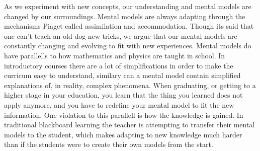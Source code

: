 \bigskip\noindent
As we experiment with new concepts, our understanding and mental models are changed by our surroundings. Mental models are always adapting through the mechanisms Piaget called assimilation and accommodation.
Though its said that one can't teach an old dog new tricks, we argue that our mental models are constantly changing and evolving to fit with new experiences. 
Mental models do have parallells to how mathematics and physics are taught in school. In introductory courses there are a lot of simplifications in order to make the curricum easy to understand, similary can a mental model contain simplified explanations of, in reality, complex phenomena. When graduating, or getting to a higher stage in your education, you learn that the thing you learned does not apply anymore, and you have to redefine your mental model to fit the new information. 
One violation to this parallell is how the knowledge is gained. In traditional blackboard learning the teacher is attempting to transfer their mental models to the student, which makes adapting to new knowledge much harder than if the students were to create their own models from the start.  

